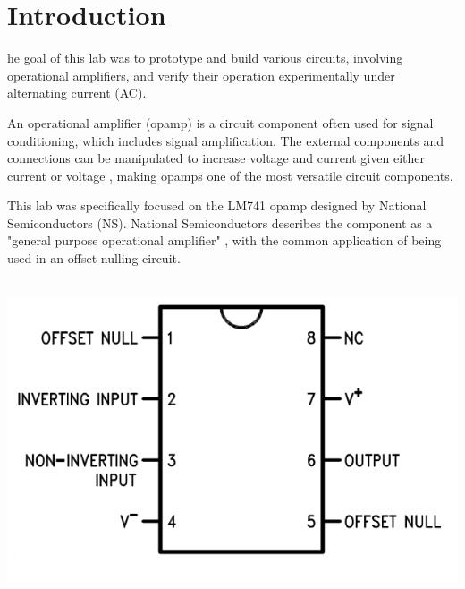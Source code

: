 \documentclass[journal]{IEEEtran}
\begin{document}




\section{Introduction}

\lowercase{he} goal of this lab was to prototype and build various circuits, involving operational amplifiers, and verify their operation experimentally under alternating current (AC).

\noindent An operational amplifier (opamp) is a circuit component often used for signal conditioning, which includes signal amplification. The external components and connections can be manipulated to increase voltage and current given either current or voltage \cite{basicOpAmp}, making opamps one of the most versatile circuit components.

\noindent This lab was specifically focused on the LM741 opamp designed by National Semiconductors (NS). National Semiconductors describes the component as a "general purpose operational amplifier" \cite{nsdata}, with the common application of being used in an offset nulling circuit. 

\\

\begingroup
    \centering
    \medskip
    \includegraphics[width=\columnwidth]{images/lab7_1.png}
    \label{fig:pin}
    \medskip
\endgroup
\end{document}
